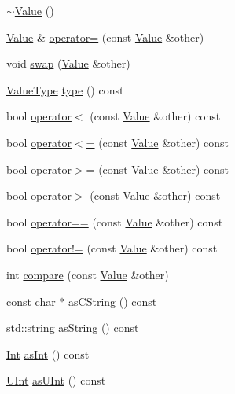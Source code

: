 \begin{DoxyCompactItemize}
\item 
\hyperlink{classJson_1_1Value_a287dea48da3912d02756735bf677b27b}{$\sim$\-Value} ()
\item 
\hyperlink{classJson_1_1Value}{Value} \& \hyperlink{classJson_1_1Value_abb95221f35541039431cd4bd21d42eaa}{operator=} (const \hyperlink{classJson_1_1Value}{Value} \&other)
\item 
void \hyperlink{classJson_1_1Value_aab841120d78e296e1bc06a373345e822}{swap} (\hyperlink{classJson_1_1Value}{Value} \&other)
\item 
\hyperlink{namespaceJson_a7d654b75c16a57007925868e38212b4e}{Value\-Type} \hyperlink{classJson_1_1Value_a695ef31fad36b4712918b3ff80158479}{type} () const 
\item 
bool \hyperlink{classJson_1_1Value_af0ad8aa027575c3277296458f3fb7b0a}{operator$<$} (const \hyperlink{classJson_1_1Value}{Value} \&other) const 
\item 
bool \hyperlink{classJson_1_1Value_afb99dd3628fe44244b32007f9b4f369a}{operator$<$=} (const \hyperlink{classJson_1_1Value}{Value} \&other) const 
\item 
bool \hyperlink{classJson_1_1Value_acc13fc47d55abd6e2327b090b83d2911}{operator$>$=} (const \hyperlink{classJson_1_1Value}{Value} \&other) const 
\item 
bool \hyperlink{classJson_1_1Value_a3124a26067bdfde9571bc89527fc6931}{operator$>$} (const \hyperlink{classJson_1_1Value}{Value} \&other) const 
\item 
bool \hyperlink{classJson_1_1Value_a14363dda23a6ae2def9afd1590ae85d3}{operator==} (const \hyperlink{classJson_1_1Value}{Value} \&other) const 
\item 
bool \hyperlink{classJson_1_1Value_ad0f12d2a4ab74bbef08a05504b2cb81d}{operator!=} (const \hyperlink{classJson_1_1Value}{Value} \&other) const 
\item 
int \hyperlink{classJson_1_1Value_a4df212f0366cc7744e415972fd5c701b}{compare} (const \hyperlink{classJson_1_1Value}{Value} \&other)
\item 
const char $\ast$ \hyperlink{classJson_1_1Value_aa900f2afa2e097086b7759f31d501efc}{as\-C\-String} () const 
\item 
std\-::string \hyperlink{classJson_1_1Value_a03ee3d5df576640c93ba683f140828bd}{as\-String} () const 
\item 
\hyperlink{classJson_1_1Value_abdf7a7ff73eb130ffcab28504ffdb405}{Int} \hyperlink{classJson_1_1Value_aa0ab989674d22421f0862769953a9915}{as\-Int} () const 
\item 
\hyperlink{classJson_1_1Value_a0933d59b45793ae4aade1757c322a98d}{U\-Int} \hyperlink{classJson_1_1Value_ac4695cb0637219692ec0071d49505a00}{as\-U\-Int} () const 

\end{DoxyCompactItemize}
